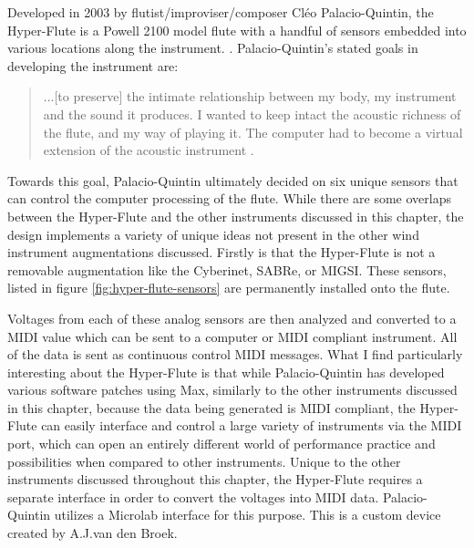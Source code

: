 Developed in 2003 by flutist/improviser/composer Cléo Palacio-Quintin, the Hyper-Flute is a Powell 2100 model flute with a handful of sensors embedded into various locations along the instrument. \cite{hyper-flute2003}. Palacio-Quintin's stated goals in developing the instrument are: 

\begin{quote}
    ...[to preserve] the intimate relationship between my body, my instrument and the sound it produces. I wanted to keep intact the acoustic richness of the flute, and my way of playing it. The computer had to become a virtual extension of the acoustic instrument \cite{hyper-flute2003}.
\end{quote}

Towards this goal, Palacio-Quintin ultimately decided on six unique sensors that can control the computer processing of the flute. While there are some overlaps between the Hyper-Flute and the other instruments discussed in this chapter, the design implements a variety of unique ideas not present in the other wind instrument augmentations discussed. Firstly is that the Hyper-Flute is not a removable augmentation like the Cyberinet, SABRe, or MIGSI. These sensors, listed in figure \ref{fig:hyper-flute-sensors} are permanently installed onto the flute. 


Voltages from each of these analog sensors are then analyzed and converted to a MIDI value which can be sent to a computer or MIDI compliant instrument. All of the data is sent as continuous control MIDI messages. What I find particularly interesting about the Hyper-Flute is that while Palacio-Quintin has developed various software patches using Max, similarly to the other instruments discussed in this chapter, because the data being generated is MIDI compliant, the Hyper-Flute can easily interface and control a large variety of instruments via the MIDI port, which can open an entirely different world of performance practice and possibilities when compared to other instruments\cite{hyper-flute2003}. Unique to the other instruments discussed throughout this chapter, the Hyper-Flute requires a separate interface in order to convert the voltages into MIDI data. Palacio-Quintin utilizes a Microlab interface for this purpose. This is a custom device created by A.J.van den Broek\cite{hyper-flute2003}. 

